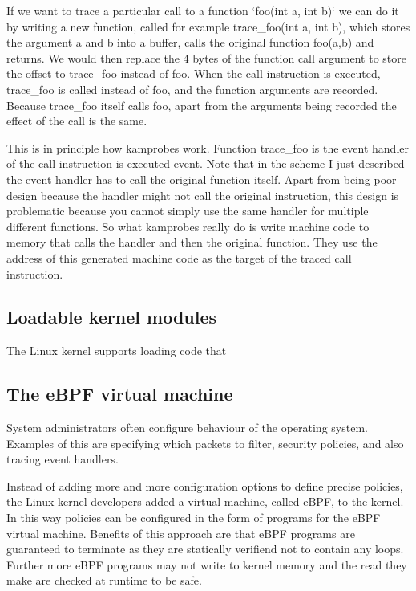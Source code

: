         If we want to trace a particular call to a function `foo(int a, int b)` we can do it by writing a new function, called for example trace\_foo(int a, int b), which stores the argument a and b into a buffer, calls the original function foo(a,b) and returns. We would then replace the 4 bytes of the function call argument to store the offset to trace\_foo instead of foo. When the call instruction is executed, trace\_foo is called instead of foo, and the function arguments are recorded. Because trace\_foo itself calls foo, apart from the arguments being recorded the effect of the call is the same.

        This is in principle how kamprobes work. Function trace\_foo is the event handler of the call instruction is executed event. Note that in the scheme I just described the event handler has to call the original function itself. Apart from being poor design because the handler might not call the original instruction, this design is problematic because you cannot simply use the same handler for multiple different functions. So what kamprobes really do is write machine code to memory that calls the handler and then the original function. They use the address of this generated machine code as the target of the traced call instruction.

    \subsection{Loadable kernel modules}
        The Linux kernel supports loading code that   

    \subsection{The eBPF virtual machine}
        System administrators often configure behaviour of the operating system. Examples of this are specifying which packets to filter, security policies, and also tracing event handlers. 

        Instead of adding more and more configuration options to define precise policies, the Linux kernel developers added a virtual machine, called eBPF, to the kernel. In this way policies can be configured in the form of programs for the eBPF virtual machine. Benefits of this approach are that eBPF programs are guaranteed to terminate as they are statically verifiend not to contain any loops. Further more eBPF programs may not write to kernel memory and the read they make are checked at runtime to be safe.

